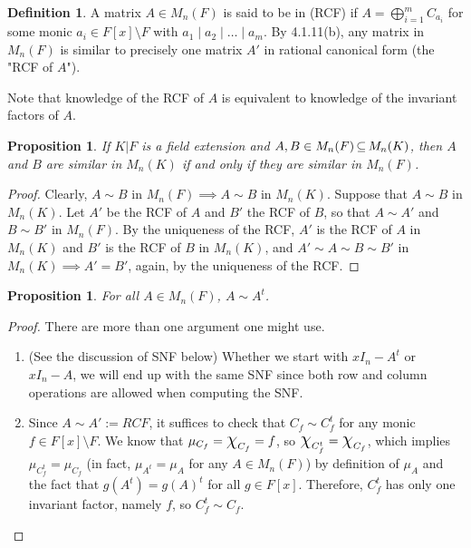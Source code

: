 \documentclass[11pt]{book}
\newcounter{counter}
\newtheorem{proposition}[counter]{Proposition}   \newtheorem{problem}[counter]{Problem}   \newtheorem*{proposition*}{Proposition}   \newtheorem*{lemma*}{Lemma}
\theoremstyle{definition}   \newtheorem{defn}[counter]{Definition} %
\newcommand{\bs}{\setminus}   \newcommand{\A}{\mathcal{A}}   \newcommand{\sy}{\textnormal{Syl}}   \newcommand{\size}[1]{\left| #1 \right|}
\newcommand{\Chi}{\mbox{\Large $\chi$}}
\newcommand{\vs}{\vspace{8pt}}
\numberwithin{counter}{chapter}
\begin{document}
\vs

\begin{defn}
A matrix $A \in M_n(F)$ is said to be in  (RCF) if $A = \bigoplus_{i=1}^m C_{a_i}$ for some monic $a_i \in F[x]\bs F$ with $a_1 \mid a_2 \mid \dots \mid a_m$. By 4.1.11(b), any matrix in $M_n(F)$ is similar to precisely one matrix $A'$ in rational canonical form  (the "RCF of $A$").
\end{defn}

Note that knowledge of the RCF of $A$ is equivalent to knowledge of the invariant factors of $A$.

\vs

\begin{proposition}
If $K|F$ is a field extension and $A,B \in M_n(F) \operatorname{\subseteq} M_n(K)$, then $A$ and $B$ are similar in $M_n(K)$ if and only if they are similar in $M_n(F)$.
\end{proposition}

\begin{proof}
Clearly, $A \sim B$ in $M_n(F) \implies A \sim B$ in $M_n(K)$. Suppose that $A \sim B$ in $M_n(K)$. Let $A'$ be the RCF of $A$ and $B'$ the RCF of $B$, so that $A \sim A'$ and $B \sim B'$ in $M_n(F)$. By the uniqueness of the RCF, $A'$ is the RCF of $A$ in $M_n(K)$ and $B'$ is the RCF of $B$ in $M_n(K)$, and $A' \sim A \sim B \sim B'$ in $M_n(K) \implies A' = B'$, again, by the uniqueness of the RCF.
\end{proof}

\vs

\begin{proposition}
For all $A \in M_n(F)$, $A \sim A^t$.
\end{proposition}

\begin{proof}
 There are more than one argument one might use.
 \begin{enumerate}
 \item[(1)] (See the discussion of SNF below) Whether we start with $xI_n - A^t$ or $xI_n - A$, we will end up with the same SNF since both row and column operations are allowed when computing the SNF.
 \item[(2)] Since $A \sim A' := RCF$, it suffices to check that $C_f \sim C_f^t$ for any monic $f \in F[x]\bs F$. We know that $\mu_{C_f} = \Chi_{C_f} = f$, so $\Chi_{C_f^t} = \Chi_{C_f}$, which implies $\mu_{C_f^t} = \mu_{C_f}$ (in fact, $\mu_{A^t} = \mu_A$ for any $A \in M_n(F)$) by definition of $\mu_A$ and the fact that $g(A^t) = g(A)^t$ for all $g \in F[x]$. Therefore, $C_f^t$ has only one invariant factor, namely $f$, so $C_f^t \sim C_f$.
 \end{enumerate}
\end{proof}
\end{document}

